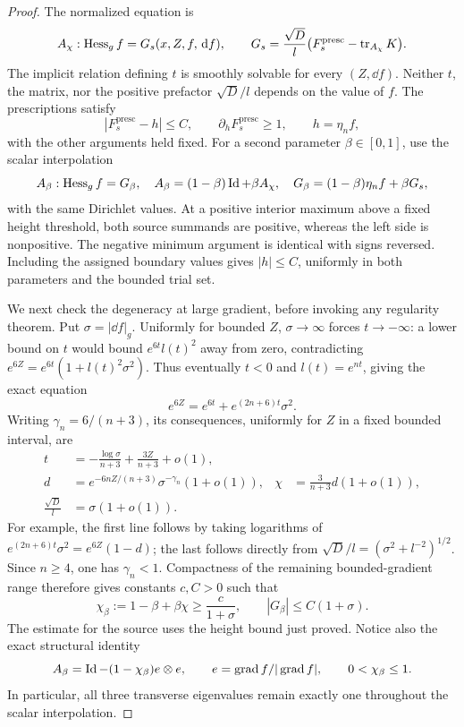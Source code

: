 \begin{proof}
The normalized equation is
\begin{equation}\label{four:ex:scalar-normalized}
 A_\chi:\operatorname{Hess}_g f=G_s(x,Z,f,\,\mathrm d f),\qquad
 G_s=\frac{\sqrt D}{l}
       \bigl(F_s^{\mathrm{presc}}-\operatorname{tr}_{A_\chi}K\bigr).
\end{equation}
The implicit relation defining $t$ is smoothly solvable for every
$(Z,\dd f)$.  Neither $t$, the matrix, nor the positive prefactor
$\sqrt D/l$ depends on the value of $f$.  The prescriptions satisfy
\[
 |F_s^{\mathrm{presc}}-h|\le C,
 \qquad \partial_h F_s^{\mathrm{presc}}\ge1,
 \qquad h=\eta_n f,
\]
with the other arguments held fixed.  For a second parameter
$\beta\in[0,1]$, use the scalar interpolation
\begin{equation}\label{four:ex:scalar-interpolation}
 A_\beta:\operatorname{Hess}_g f=G_\beta,
 \quad A_\beta=(1-\beta)\operatorname{Id}+\beta A_\chi,
 \quad G_\beta=(1-\beta)\eta_n f+\beta G_s,
\end{equation}
with the same Dirichlet values.  At a positive interior maximum above a
fixed height threshold, both source summands are positive, whereas the
left side is nonpositive.  The negative minimum argument is identical
with signs reversed.  Including the assigned boundary values gives
$|h|\le C$, uniformly in both parameters and the bounded trial set.

We next check the degeneracy at large gradient, before invoking any
regularity theorem.  Put $\sigma=|\dd f|_g$.  Uniformly for bounded $Z$,
$\sigma\to\infty$ forces $t\to-\infty$: a lower bound on $t$ would bound
$e^{6t}l(t)^2$ away from zero, contradicting
$e^{6Z}=e^{6t}(1+l(t)^2\sigma^2)$.  Thus eventually $t<0$ and
$l(t)=e^{nt}$, giving the exact equation
\begin{equation}\label{four:ex:large-gradient-equation}
 e^{6Z}=e^{6t}+e^{(2n+6)t}\sigma^2.
\end{equation}
Writing $\gamma_n=6/(n+3)$, its consequences, uniformly for $Z$ in a
fixed bounded interval, are
\begin{align}
 t&=-\frac{\log\sigma}{n+3}+\frac{3Z}{n+3}+o(1),\nonumber\\
 d&=e^{-6nZ/(n+3)}\sigma^{-\gamma_n}(1+o(1)),
 &\chi&=\frac{3}{n+3}d(1+o(1)),\label{four:ex:large-gradient}\\
 \frac{\sqrt D}{l}&=\sigma(1+o(1)).\nonumber
\end{align}
For example, the first line follows by taking logarithms of
$e^{(2n+6)t}\sigma^2=e^{6Z}(1-d)$; the last follows directly from
$\sqrt D/l=(\sigma^2+l^{-2})^{1/2}$.
Since $n\ge4$, one has $\gamma_n<1$.  Compactness of the remaining
bounded-gradient range therefore gives constants $c,C>0$ such that
\begin{equation}\label{four:ex:linear-growth}
 \chi_\beta:=1-\beta+\beta\chi\ge\frac{c}{1+\sigma},
 \qquad |G_\beta|\le C(1+\sigma).
\end{equation}
The estimate for the source uses the height bound just proved.  Notice
also the exact structural identity
\[
 A_\beta=\operatorname{Id}-(1-\chi_\beta)e\otimes e,
 \qquad e=\operatorname{grad} f/|\operatorname{grad} f|,
 \qquad 0<\chi_\beta\le1.
\]
In particular, all three transverse eigenvalues remain exactly one
throughout the scalar interpolation.


\end{proof}
